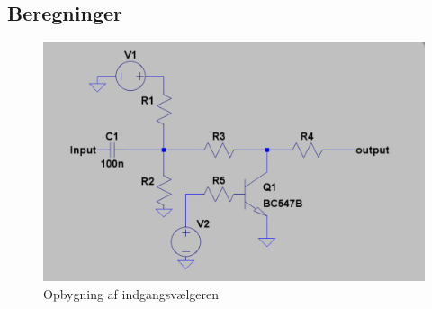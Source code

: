 \subsection*{Beregninger}

\begin{figure}[h]
\centering
\includegraphics[scale=0.6]{implementering/indgangsvaelger/signal-taend-sluk.png}
\caption{Opbygning af indgangsvælgeren}
\label{indgangsvaelger-overordnet}
\end{figure}

